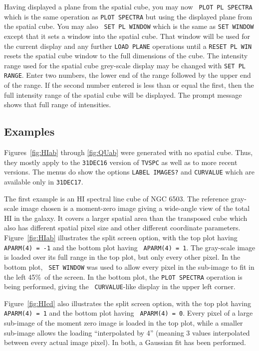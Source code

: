 \documentclass[twoside]{article}
\newcommand{\Hi}[1]{\textcolor{hicol}{#1}}
\newcommand{\Me}[1]{\textcolor{mecol}{#1}}
\begin{document}
\Me{Having displayed a plane from the spatial cube, you may now {\tt
PLOT PL SPECTRA} which is the same operation as {\tt PLOT SPECTRA} but
using the displayed plane from the spatial cube.  You may also {\tt
  SET PL WINDOW} which is the same as {\tt SET WINDOW} except that it
sets a window into the spatial cube.  That window will be used for the
current display and any further {\tt LOAD PLANE} operations until a
{\tt RESET PL WIN} resets the spatial cube window to the full
dimensions of the cube.  The intensity range used for the spatial cube
grey-scale display may be changed with {\tt SET PL RANGE}\@.  Enter
two numbers, the lower end of the range followed by the upper end of
the range.  If the second number entered is less than or equal the
first, then the full intensity range of the spatial cube will be
displayed.  The prompt message shows that full range of intensities.}

\subsection{Examples}

Figures~\ref{fig:HIab} through \ref{fig:QUab} were generated with no
spatial cube.  Thus, they \Hi{mostly} apply to the {\tt 31DEC16}
  version of {\tt TVSPC} as well as to more recent versions.  \Hi{The
  menus do show the options {\tt LABEL IMAGES?} and {\tt CURVALUE}
  which are available only in {\tt 31DEC17}\@.}

The first example is an HI spectral line cube of NGC 6503.  The
reference gray-scale image chosen is a moment-zero image giving a
wide-angle view of the total HI in the galaxy.  It covers a larger
spatial area than the transposed cube which also has different spatial
pixel size and other different coordinate parameters.
Figure~\ref{fig:HIab} illustrates the split screen option, with the
top plot having {\tt APARM(4) = -1} and the bottom plot having {\tt
  APARM(4) = 1}\@.  The gray-scale image is loaded over its full range
in the top plot, but only every other pixel.  In the bottom plot, {\tt
  SET WINDOW} was used to allow every pixel in the sub-image to fit in
the left 45\%\ of the screen.  In the bottom plot, the {\tt PLOT
  SPECTRA} operation is being performed, giving the {\tt
  CURVALUE}-like display in the upper left corner.

Figure~\ref{fig:HIcd} also illustrates the split screen option, with
the top plot having {\tt APARM(4) = 1} and the bottom plot having {\tt
  APARM(4) = 0}\@.  Every pixel of a large sub-image of the moment
zero image is loaded in the top plot, while a smaller sub-image allows
the loading ``interpolated by 4'' (meaning 3 values interpolated
between every actual image pixel).  In both, a Gaussian fit has been
performed.
\end{document}
